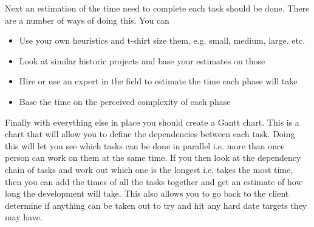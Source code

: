 \documentclass{article}
\begin{document}
Next an estimation of the time need to complete each task should be done. There are a number of ways of doing this. You can 
\begin{itemize}
\item  Use your own heuristics and t-shirt size them, e.g. small, medium, large, etc.
\item Look at similar historic projects and base your estimates on those
\item Hire or use an expert in the field to estimate the time each phase will take
\item Base the time on the perceived complexity of each phase
\end{itemize}


Finally with everything else in place you should create a Gantt chart. This is a chart that will allow you to define the dependencies between each task. Doing this will let you see which tasks can be done in parallel i.e. more than once person can work on them at the same time. If you then look at the dependency chain of tasks and work out which one is the longest i.e. takes the most time, then you can add the times of all the tasks together and get an estimate of how long the development will take. This also allows you to go back to the client determine if anything can be taken out to try and hit any hard date targets they may have.
\end{document}
